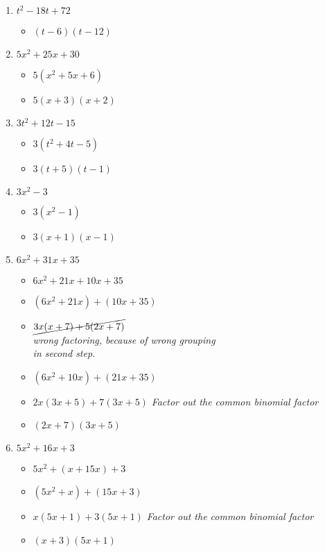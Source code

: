 \documentclass{article}
\begin{document}
\begin{onehalfspace}
\begin{enumerate}
        \item $t^{2} - 18t + 72$
        \begin{itemize}
            \item $(t - 6)(t - 12)$
        \end{itemize}

        \item $5x^{2} + 25x + 30$
        \begin{itemize}
            \item $5(x^{2} + 5x + 6)$
            \item $5(x + 3)(x + 2)$
        \end{itemize}

        \item $3t^{2} + 12t - 15$
        \begin{itemize}
            \item $3(t^{2} + 4t - 5)$
            \item $3(t + 5)(t - 1)$
        \end{itemize}

        \item $3x^{2} - 3$
        \begin{itemize}
            \item $3(x^{2} - 1)$
            \item $3(x + 1)(x - 1)$
        \end{itemize}

        \item $6x^{2} + 31x + 35$
        \begin{itemize}
            \item $6x^{2} + 21x + 10x + 35$
            \item $(6x^{2} + 21x) + (10x + 35)$
            \item $\cancel{3x(x + 7) + 5(2x + 7)}$ \\ 
            \textit{wrong factoring, because of wrong grouping \\
            in second step.}
            \item $(6x^{2} + 10x) + (21x + 35)$
            \item $2x(3x + 5) + 7(3x + 5)$ \textit{Factor out the common binomial factor}
            \item $(2x + 7)(3x + 5)$
        \end{itemize}

        \item $5x^{2} + 16x + 3$
        \begin{itemize}
            \item $5x^{2} + (x + 15x) + 3$
            \item $(5x^{2} + x) + (15x + 3)$
            \item $x(5x + 1) + 3(5x + 1)$ \textit{Factor out the common binomial factor}
            \item $(x + 3)(5x + 1)$
        \end{itemize}


\end{enumerate}
\end{onehalfspace}
\end{document}
